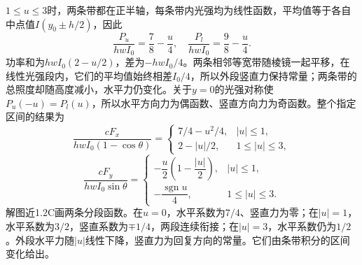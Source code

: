 \documentclass[UTF8,fontset=fandol,a4paper,11pt]{ctexart}
\begin{document}
$1\le u\le3$时，两条带都在正半轴，每条带内光强均为线性函数，平均值等于各自中点值$I(y_0\pm h/2)$，因此
\[
\frac{P_u}{hwI_0}=\frac78-\frac u4,\quad
\frac{P_l}{hwI_0}=\frac98-\frac u4.
\]
功率和为$hwI_0(2-u/2)$，差为$-hwI_0/4$。两条相邻等宽带随棱镜一起平移，在线性光强段内，它们的平均值始终相差$I_0/4$，所以外段竖直力保持常量；两条带的总照度却随高度减小，水平力仍变化。关于$y=0$的光强对称使$P_u(-u)=P_l(u)$，所以水平方向力为偶函数、竖直方向力为奇函数。整个指定区间的结果为
\[
\boxed{\frac{cF_x}{hwI_0(1-\cos\theta)}
=\begin{cases}7/4-u^2/4,&|u|\leqslant1,\\2-|u|/2,&1\leqslant|u|\leqslant3,\end{cases}}
\]
\[
\boxed{\frac{cF_y}{hwI_0\sin\theta}
=\begin{cases}-\dfrac u2(1-\dfrac{|u|}2),&|u|\leqslant1,\\
-\dfrac{\operatorname{sgn}u}{4},&1\leqslant|u|\leqslant3.\end{cases}}
\]
解图近1.2C画两条分段函数。在$u=0$，水平系数为$7/4$、竖直力为零；在$|u|=1$，水平系数为$3/2$，竖直系数为$\mp1/4$，两段连续衔接；在$|u|=3$，水平系数仍为$1/2$。外段水平力随$|u|$线性下降，竖直力为回复方向的常量。它们由条带积分的区间变化给出。
\end{document}
